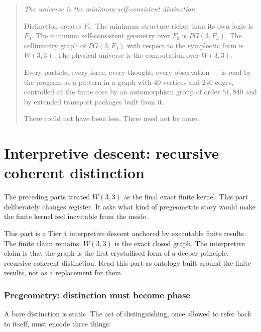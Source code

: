 \documentclass[11pt]{article}
\def\mathbb#1{#1}%
\def\mathrm#1{#1}%
\def\textbf#1{#1}%
\begin{document}
\begin{quote}
\itshape
The universe is the minimum self-consistent distinction.

\medskip

Distinction creates $\mathbb{F}_2$. The minimum structure richer than its own logic is $\mathbb{F}_3$. The minimum self-consistent geometry over $\mathbb{F}_3$ is $\mathrm{PG}(3, \mathbb{F}_3)$. The collinearity graph of $\mathrm{PG}(3, \mathbb{F}_3)$ with respect to the symplectic form is $W(3,3)$. The physical universe is the computation over $W(3,3)$.

\medskip

Every particle, every force, every thought, every observation --- is read by the program as a pattern in a graph with $40$ vertices and $240$ edges, controlled at the finite core by an automorphism group of order $51{,}840$ and by extended transport packages built from it.

\medskip

There could not have been less. There need not be more.
\end{quote}

\part{Interpretive descent: recursive coherent distinction}

The preceding parts treated $W(3,3)$ as the final exact finite kernel. This part deliberately changes register. It asks what kind of pregeometric story would make the finite kernel feel inevitable from the inside.

\begin{statusbox}[title=Interpretive status]
This part is a Tier 4 interpretive descent anchored by executable finite results. The finite claim remains: $W(3,3)$ is the exact closed graph. The interpretive claim is that the graph is the first crystallised form of a deeper principle: \textbf{recursive coherent distinction}. Read this part as ontology built around the finite results, not as a replacement for them.
\end{statusbox}

\section{Pregeometry: distinction must become phase}

A bare distinction is static. The act of distinguishing, once allowed to refer back to itself, must encode three things:
\end{document}
